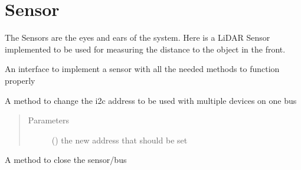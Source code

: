 \documentclass[letterpaper,10pt,english]{sphinxmanual}
\begin{document}
\ignorespaces 

\chapter{Sensor}
\label{\detokenize{sensor:sensor}}\label{\detokenize{sensor:index-0}}\label{\detokenize{sensor::doc}}
The Sensors are the eyes and ears of the system. Here is a LiDAR Sensor implemented to be used for measuring the distance
to the object in the front.

\begin{fulllineitems}
\label{\detokenize{sensor:lib.sensor.SensorInterface}}
An interface to implement a sensor with all the needed methods to function properly

\begin{fulllineitems}
\label{\detokenize{sensor:lib.sensor.SensorInterface.change_addr}}
A method to change the i2c address to be used with multiple devices on one bus
\begin{quote}\begin{description}
\item[{Parameters}] \leavevmode
{} () \textendash{} the new address that should be set

\end{description}\end{quote}

\end{fulllineitems}


\begin{fulllineitems}
\label{\detokenize{sensor:lib.sensor.SensorInterface.close}}
A method to close the sensor/bus


\end{fulllineitems}
\end{fulllineitems}
\end{document}
